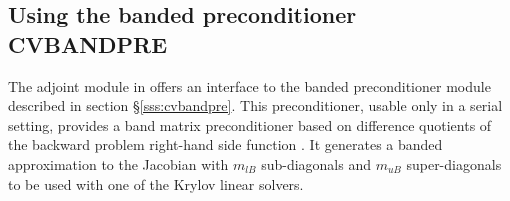 \subsection{Using the banded preconditioner CVBANDPRE}

The adjoint module in {\cvodes} offers an interface to the banded 
preconditioner module {\cvbandpre} described in section \S\ref{sss:cvbandpre}.
This preconditioner, usable only in a serial setting, provides a band matrix 
preconditioner based on difference quotients of the backward problem right-hand 
side function .  It generates
a banded approximation to the Jacobian with $m_{lB}$ sub-diagonals and $m_{uB}$
super-diagonals to be used with one of the Krylov linear solvers.

